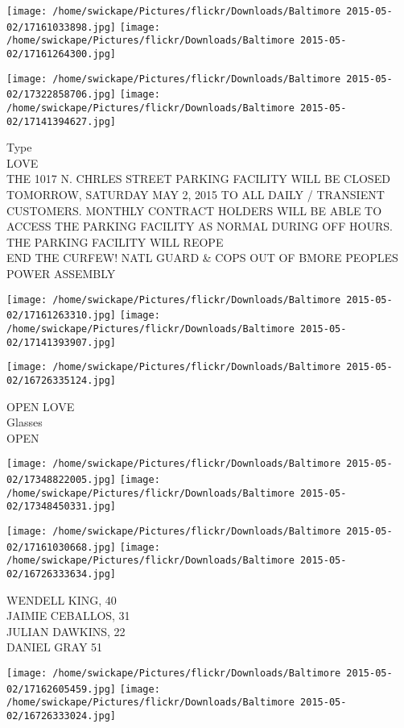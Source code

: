 \documentclass[10pt,letterpaper]{article}
\begin{document}
\texttt{[image: /home/swickape/Pictures/flickr/Downloads/Baltimore 2015-05-02/17161033898.jpg]}
\texttt{[image: /home/swickape/Pictures/flickr/Downloads/Baltimore 2015-05-02/17161264300.jpg]}

\texttt{[image: /home/swickape/Pictures/flickr/Downloads/Baltimore 2015-05-02/17322858706.jpg]}
\texttt{[image: /home/swickape/Pictures/flickr/Downloads/Baltimore 2015-05-02/17141394627.jpg]}

Type\\
LOVE\\
THE 1017 N. CHRLES STREET PARKING FACILITY WILL BE CLOSED TOMORROW, SATURDAY MAY 2, 2015 TO ALL DAILY / TRANSIENT CUSTOMERS.  MONTHLY CONTRACT HOLDERS WILL BE ABLE TO ACCESS THE PARKING FACILITY AS NORMAL DURING OFF HOURS.  THE PARKING FACILITY WILL REOPE\\
END THE CURFEW!  NATL GUARD \& COPS OUT OF BMORE PEOPLES POWER ASSEMBLY\\
\pagebreak

\texttt{[image: /home/swickape/Pictures/flickr/Downloads/Baltimore 2015-05-02/17161263310.jpg]}
\texttt{[image: /home/swickape/Pictures/flickr/Downloads/Baltimore 2015-05-02/17141393907.jpg]}

\vspace{0.25in}
\texttt{[image: /home/swickape/Pictures/flickr/Downloads/Baltimore 2015-05-02/16726335124.jpg]}

OPEN LOVE\\
Glasses\\
OPEN\\
\pagebreak

\texttt{[image: /home/swickape/Pictures/flickr/Downloads/Baltimore 2015-05-02/17348822005.jpg]}
\texttt{[image: /home/swickape/Pictures/flickr/Downloads/Baltimore 2015-05-02/17348450331.jpg]}

\texttt{[image: /home/swickape/Pictures/flickr/Downloads/Baltimore 2015-05-02/17161030668.jpg]}
\texttt{[image: /home/swickape/Pictures/flickr/Downloads/Baltimore 2015-05-02/16726333634.jpg]}

WENDELL KING, 40\\
JAIMIE CEBALLOS, 31\\
JULIAN DAWKINS, 22\\
DANIEL GRAY 51\\
\pagebreak

\texttt{[image: /home/swickape/Pictures/flickr/Downloads/Baltimore 2015-05-02/17162605459.jpg]}
\texttt{[image: /home/swickape/Pictures/flickr/Downloads/Baltimore 2015-05-02/16726333024.jpg]}
\end{document}
